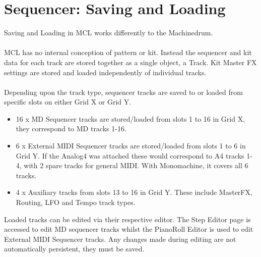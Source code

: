 \chapter{Sequencer: Saving and Loading}
Saving and Loading in MCL works differently to the Machinedrum.\\\\
MCL has no internal conception of pattern or kit. Instead the sequencer and kit data for each track are stored together as a single object, a Track. Kit Master FX settings are stored and loaded independently of individual tracks.
\\\\
Depending upon the track type, sequencer tracks are saved to or loaded from specific slots on either Grid X or Grid Y.

\begin{itemize}
    \item 16 x MD Sequencer tracks are stored/loaded from slots 1 to 16 in Grid X, they correspond to MD tracks 1-16.
    \item 6 x External MIDI Sequencer tracks are stored/loaded from slots 1 to 6 in Grid Y. If the Analog4 was attached these would correspond to A4 tracks 1- 4, with 2 spare tracks for general MIDI. With Monomachine, it covers all 6 tracks.
    \item 4 x Auxiliary tracks from slots 13 to 16 in Grid Y. These include MasterFX, Routing, LFO and Tempo track types.
\end{itemize}

Loaded tracks can be edited via their respective editor. The Step Editor page is accessed to edit MD sequencer tracks whilst the PianoRoll Editor is used to edit External MIDI Sequencer tracks. Any changes made during editing are not automatically persistent, they must be saved.\\

